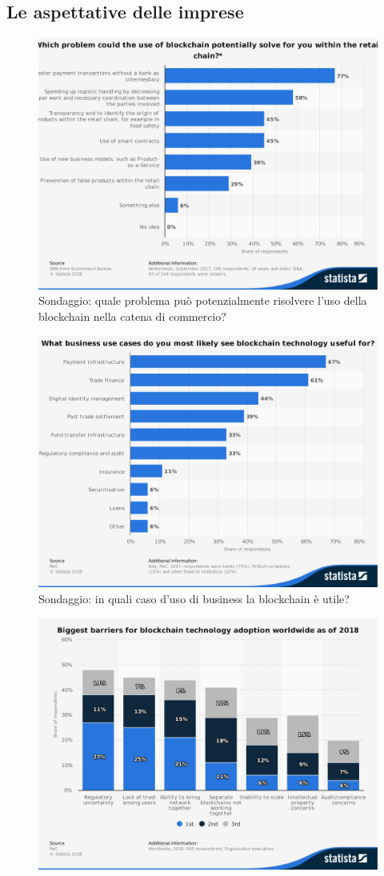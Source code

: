 \subsection{Le aspettative delle imprese}
\begin{figure}[H]
	\centering
	\includegraphics[width=.75\linewidth]{images/chap_intro/potential-blockchain-applications.pdf}
	\caption{Sondaggio: quale problema può potenzialmente risolvere l'uso della blockchain
		nella catena di commercio? \cite{potential-blockchain-applications}}
\end{figure}
\begin{figure}[H]
	\centering
	\includegraphics[width=.75\linewidth]{images/chap_intro/use-cases-among-businesses.pdf}
	\caption{Sondaggio: in quali caso d'uso di business la blockchain è utile?
		\cite{use-cases-among-businesses}}
\end{figure}
\begin{figure}[H]
	\centering
	\includegraphics[width=.75\linewidth]{images/chap_intro/barriers-worldwide.pdf}
	\caption{
		\cite{barriers-worldwide}}
\end{figure}